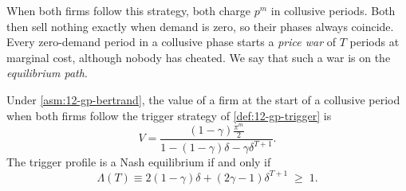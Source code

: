 When both firms follow this strategy, both charge $p^m$ in collusive periods. Both then sell nothing exactly when
demand is zero, so their phases always coincide. Every zero-demand period in a collusive phase starts a \emph{price
war} of $T$ periods at marginal cost, although nobody has cheated. We say that such a war is on the
\emph{equilibrium path}.

\begin{proposition}\label{prop:12-gp-bertrand}
Under \cref{asm:12-gp-bertrand}, the value of a firm at the start of a collusive period when both firms follow the
trigger strategy of \cref{def:12-gp-trigger} is
\begin{equation}\label{eq:12-gp-V}
V = \frac{(1 - \gamma)\frac{\pi^m}{2}}{1 - (1 - \gamma)\delta - \gamma\delta^{T + 1}} .
\end{equation}
The trigger profile is a Nash equilibrium if and only if
\begin{equation}\label{eq:12-gp-ic}
\Lambda(T) \equiv 2(1 - \gamma)\delta + (2\gamma - 1)\delta^{T + 1} \;\ge\; 1 .
\end{equation}
\end{proposition}

